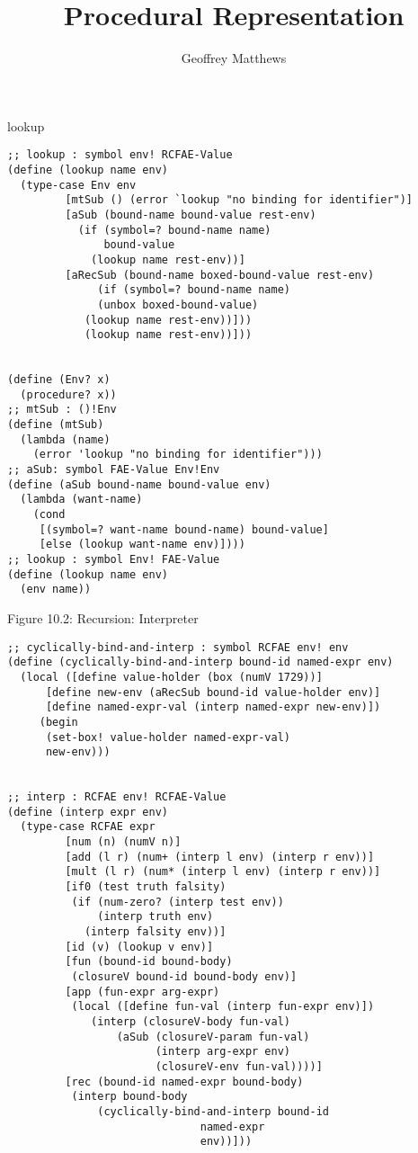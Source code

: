 \documentclass[12pt]{article}
\title{Procedural Representation}
\author{Geoffrey Matthews}
\newcommand{\bfr}[1]{\newpage\centerline{#1}}
\begin{document}
\maketitle

\bfr{lookup}

\begin{lstlisting}
;; lookup : symbol env! RCFAE-Value
(define (lookup name env)
  (type-case Env env
	     [mtSub () (error `lookup "no binding for identifier")]
	     [aSub (bound-name bound-value rest-env)
		   (if (symbol=? bound-name name)
		       bound-value
		     (lookup name rest-env))]
	     [aRecSub (bound-name boxed-bound-value rest-env)
		      (if (symbol=? bound-name name)
			  (unbox boxed-bound-value)
			(lookup name rest-env))]))
			(lookup name rest-env))]))
			
			
(define (Env? x)
  (procedure? x))
;; mtSub : ()!Env
(define (mtSub)
  (lambda (name)
    (error 'lookup "no binding for identifier")))
;; aSub: symbol FAE-Value Env!Env
(define (aSub bound-name bound-value env)
  (lambda (want-name)
    (cond
     [(symbol=? want-name bound-name) bound-value]
     [else (lookup want-name env)])))
;; lookup : symbol Env! FAE-Value
(define (lookup name env)
  (env name))

\end{lstlisting}


\bfr{Figure 10.2: Recursion: Interpreter}
\begin{lstlisting}
;; cyclically-bind-and-interp : symbol RCFAE env! env
(define (cyclically-bind-and-interp bound-id named-expr env)
  (local ([define value-holder (box (numV 1729))]
	  [define new-env (aRecSub bound-id value-holder env)]
	  [define named-expr-val (interp named-expr new-env)])
	 (begin
	  (set-box! value-holder named-expr-val)
	  new-env)))


;; interp : RCFAE env! RCFAE-Value
(define (interp expr env)
  (type-case RCFAE expr
	     [num (n) (numV n)]
	     [add (l r) (num+ (interp l env) (interp r env))]
	     [mult (l r) (num* (interp l env) (interp r env))]
	     [if0 (test truth falsity)
		  (if (num-zero? (interp test env))
		      (interp truth env)
		    (interp falsity env))]
	     [id (v) (lookup v env)]
	     [fun (bound-id bound-body)
		  (closureV bound-id bound-body env)]
	     [app (fun-expr arg-expr)
		  (local ([define fun-val (interp fun-expr env)])
			 (interp (closureV-body fun-val)
				 (aSub (closureV-param fun-val)
				       (interp arg-expr env)
				       (closureV-env fun-val))))]
	     [rec (bound-id named-expr bound-body)
		  (interp bound-body
			  (cyclically-bind-and-interp bound-id
						      named-expr
						      env))]))
\end{lstlisting}
\end{document}
